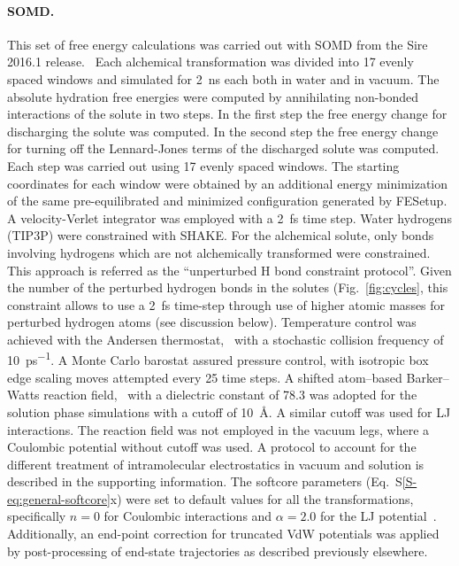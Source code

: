 \documentclass[journal=jctcce,manuscript=article]{achemso}
\begin{document}
\paragraph{SOMD.}
This set of free energy calculations was carried out with SOMD from the Sire 2016.1 release.~\cite{Sire-2016, doi:10.1021/ct300857j}
Each alchemical transformation was divided into 17 evenly spaced windows and simulated for \SI{2}{ns} each both in water and in vacuum. The absolute hydration free energies were computed by annihilating non-bonded interactions of the solute in two steps. In the first step the free energy change for discharging the solute was computed. In the second step the free energy change for turning off the Lennard-Jones terms of the discharged solute was computed. Each step was carried out using 17 evenly spaced windows.
The starting coordinates for each window were obtained by an additional energy minimization of the same pre-equilibrated and minimized configuration generated by FESetup.
A velocity-Verlet integrator was employed with a \SI{2}{fs} time step.
Water hydrogens (TIP3P) were constrained with SHAKE. For the alchemical solute, only bonds involving hydrogens which are not alchemically transformed were constrained. This approach is referred as the ``unperturbed H bond constraint protocol''. Given the number of the perturbed hydrogen bonds in the solutes (Fig.~\ref{fig:cycles}, this constraint allows to use a \SI{2}{fs} time-step through use of higher atomic masses for perturbed hydrogen atoms (see discussion below).
Temperature control was achieved with the Andersen thermostat,~\cite{doi:10.1063/1.439486} with a stochastic collision frequency of \SI{10}{ps^{-1}}.
A Monte Carlo barostat assured pressure control, with isotropic box edge scaling moves attempted every 25 time steps.
A shifted atom--based Barker--Watts reaction field,~\cite{doi:10.1080/00268977300102101} with a dielectric constant of \num{78.3} was adopted for the solution phase simulations with a cutoff of \SI{10}{\angstrom}. A similar cutoff was used for LJ interactions.
The reaction field was not employed in the vacuum legs, where a Coulombic potential without cutoff was used.  A protocol to account for the different treatment of intramolecular electrostatics in vacuum and solution is described in the supporting information.
The softcore parameters (Eq.~S\ref{S-eq:general-softcore}x) were set to default values for all the transformations,
specifically $n = 0$ for Coulombic interactions and $\alpha = 2.0$ for the LJ potential~\cite{doi:10.1021/ct700081t}.
Additionally, an end-point correction for truncated VdW potentials was applied by post-processing of end-state trajectories as described previously elsewhere.~\cite{shirtsLRC,BosisioHG}
\end{document}
